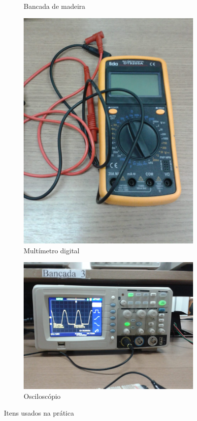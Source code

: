 \documentclass[
	12pt,				%
	openright,			%
	twoside,			%
	a4paper,			%
	article,	
	english,			%
	french,				%
	spanish,			%
	brazil				%
	]{abntex2}
\begin{document}
\begin{figure}[H]
\begin{subfigure}[H]{0.3\textwidth}
		\caption{Bancada de madeira}
	\end{subfigure}
\hfill
	\begin{subfigure}[H]{0.3\textwidth}\center
		\includegraphics[angle=90, width=\textwidth]{multimetro.jpeg}
		\caption{Multímetro digital}
	\end{subfigure}
\hspace{0.5cm}
	\begin{subfigure}[H]{0.3\textwidth}\center
		\includegraphics[width=\textwidth]{osciloscopio.jpeg}
		\caption{Osciloscópio}
	\end{subfigure}
	\caption{Itens usados na prática}
\end{figure}
\end{document}
